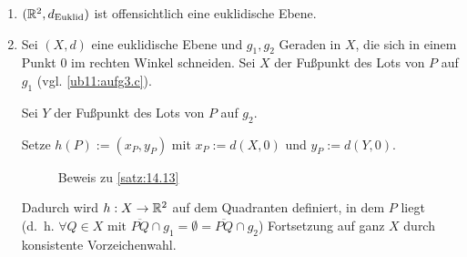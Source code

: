 \begin{beweis}\leavevmode
    \begin{enumerate}[label=(\roman*)]
        \item $(\mathbb{R}^2, d_\text{Euklid})$ ist offensichtlich eine euklidische Ebene.
        \item Sei $(X,d)$ eine euklidische Ebene und $g_1, g_2$ Geraden
              in $X$, die sich in einem Punkt $0$ im rechten Winkel
              schneiden. Sei $X$ der Fußpunkt des Lots von $P$ auf
              $g_1$ (vgl. \cref{ub11:aufg3.c}).

              Sei $Y$ der Fußpunkt des Lots von $P$ auf $g_2$.

              Setze $h(P) := (x_P, y_P)$ mit 
              $x_P := d(X, 0)$ und $y_P := d(Y, 0)$.

            \begin{figure}[ht]
                \centering
                \subfloat[Schritt 1]{
                    \resizebox{0.45\linewidth}{!}{}
                    \label{fig:14.13.1}
                }%
                \subfloat[Schritt 2]{
                    \resizebox{0.45\linewidth}{!}{}
                    \label{fig:14.13.2}
                }%
                \label{fig:14.13.0.1}
                \caption{Beweis zu \cref{satz:14.13}}
            \end{figure}

            Dadurch wird $h:X \rightarrow \mathbb{R}^2$ auf dem Quadranten
            definiert, in dem $P$ liegt (d.~h. $\forall Q \in X \text{ mit } \overline{PQ} \cap g_1 = \emptyset = \overline{PQ} \cap g_2$)
            Fortsetzung auf ganz $X$ durch konsistente Vorzeichenwahl.


\end{enumerate}
\end{beweis}
